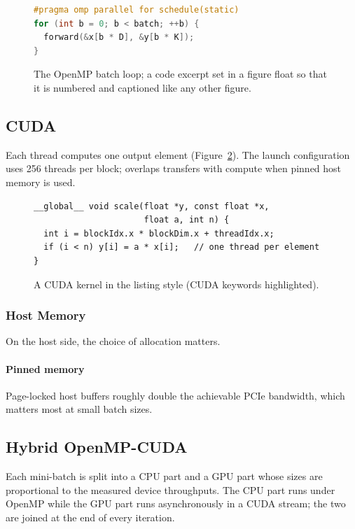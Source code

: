 \documentclass[siunitx]{cs259}
\begin{document}
\begin{figure}[t]
\begin{lstlisting}[language=C++]
#pragma omp parallel for schedule(static)
for (int b = 0; b < batch; ++b) {
  forward(&x[b * D], &y[b * K]);
}
\end{lstlisting}
\caption{The OpenMP batch loop; a code excerpt set in a figure float so
that it is numbered and captioned like any other figure.}
\label{lst:omp}
\end{figure}

\subsection{CUDA}
Each thread computes one output element (Figure~\ref{lst:cuda}). The launch configuration uses 256
threads per block;  overlaps transfers with compute
when pinned host memory is used.

\begin{figure}[t]
\begin{lstlisting}[language=CUDA]
__global__ void scale(float *y, const float *x,
                      float a, int n) {
  int i = blockIdx.x * blockDim.x + threadIdx.x;
  if (i < n) y[i] = a * x[i];   // one thread per element
}
\end{lstlisting}
\caption{A CUDA kernel in the listing style (CUDA keywords highlighted).}
\label{lst:cuda}
\end{figure}

\subsubsection{Host Memory}
On the host side, the choice of allocation matters.

\paragraph{Pinned memory}
Page-locked host buffers roughly double the achievable PCIe bandwidth, which
matters most at small batch sizes.

\subsection{Hybrid OpenMP-CUDA}
Each mini-batch is split into a CPU part and a GPU part whose sizes are
proportional to the measured device throughputs. The CPU part runs under
OpenMP while the GPU part runs asynchronously in a CUDA stream; the two are
joined at the end of every iteration.
\end{document}
